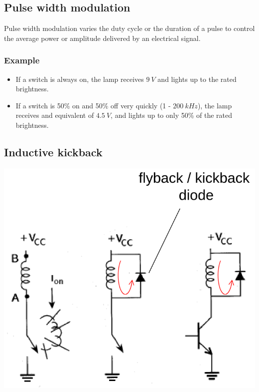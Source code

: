 \documentclass[11pt]{article}
\begin{document}
\subsection{Pulse width modulation}
\label{sec:org64ebe13}
Pulse width modulation varies the duty cycle or the duration of a pulse to control the average power or amplitude delivered by an electrical signal.

\subsubsection{Example}
\label{sec:orga24763c}
\begin{itemize}
\item If a switch is always on, the lamp receives \(\qty{9}{V}\) and lights up to the rated brightness.
\item If a switch is 50\% on and 50\% off very quickly (1 - \(\qty{200}{kHz}\)), the lamp receives and equivalent of \(\qty{4.5}{V}\), and lights up to only 50\% of the rated brightness.
\end{itemize}

\subsection{Inductive kickback}
\label{sec:orgb1ffd32}
\begin{center}
\includegraphics[scale=0.75]{./images/inductive-kickback.png}
\end{center}
\end{document}
